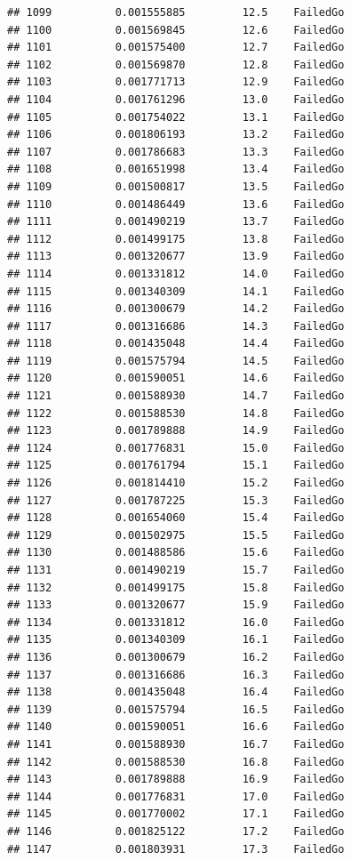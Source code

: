 \documentclass[
]{article}
\begin{document}
\begin{verbatim}
## 1099          0.001555885         12.5    FailedGo
## 1100          0.001569845         12.6    FailedGo
## 1101          0.001575400         12.7    FailedGo
## 1102          0.001569870         12.8    FailedGo
## 1103          0.001771713         12.9    FailedGo
## 1104          0.001761296         13.0    FailedGo
## 1105          0.001754022         13.1    FailedGo
## 1106          0.001806193         13.2    FailedGo
## 1107          0.001786683         13.3    FailedGo
## 1108          0.001651998         13.4    FailedGo
## 1109          0.001500817         13.5    FailedGo
## 1110          0.001486449         13.6    FailedGo
## 1111          0.001490219         13.7    FailedGo
## 1112          0.001499175         13.8    FailedGo
## 1113          0.001320677         13.9    FailedGo
## 1114          0.001331812         14.0    FailedGo
## 1115          0.001340309         14.1    FailedGo
## 1116          0.001300679         14.2    FailedGo
## 1117          0.001316686         14.3    FailedGo
## 1118          0.001435048         14.4    FailedGo
## 1119          0.001575794         14.5    FailedGo
## 1120          0.001590051         14.6    FailedGo
## 1121          0.001588930         14.7    FailedGo
## 1122          0.001588530         14.8    FailedGo
## 1123          0.001789888         14.9    FailedGo
## 1124          0.001776831         15.0    FailedGo
## 1125          0.001761794         15.1    FailedGo
## 1126          0.001814410         15.2    FailedGo
## 1127          0.001787225         15.3    FailedGo
## 1128          0.001654060         15.4    FailedGo
## 1129          0.001502975         15.5    FailedGo
## 1130          0.001488586         15.6    FailedGo
## 1131          0.001490219         15.7    FailedGo
## 1132          0.001499175         15.8    FailedGo
## 1133          0.001320677         15.9    FailedGo
## 1134          0.001331812         16.0    FailedGo
## 1135          0.001340309         16.1    FailedGo
## 1136          0.001300679         16.2    FailedGo
## 1137          0.001316686         16.3    FailedGo
## 1138          0.001435048         16.4    FailedGo
## 1139          0.001575794         16.5    FailedGo
## 1140          0.001590051         16.6    FailedGo
## 1141          0.001588930         16.7    FailedGo
## 1142          0.001588530         16.8    FailedGo
## 1143          0.001789888         16.9    FailedGo
## 1144          0.001776831         17.0    FailedGo
## 1145          0.001770002         17.1    FailedGo
## 1146          0.001825122         17.2    FailedGo
## 1147          0.001803931         17.3    FailedGo

\end{verbatim}
\end{document}
